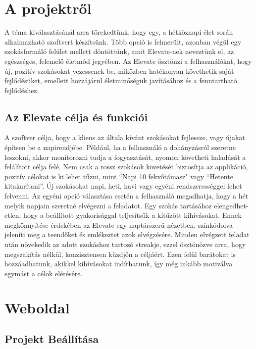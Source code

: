\documentclass[12pt]{report}
\begin{document}


\setcounter{tocdepth}{2}
\tableofcontents

\chapter{A projektről}
\begin{sloppypar}
A téma kiválasztásánál arra törekedtünk, hogy egy, a hétköznapi élet során alkalmazható szoftvert készítsünk. Több opció is felmerült, azonban végül egy szokásformáló felület mellett döntöttünk, amit Elevate-nek neveztünk el, az egészséges, felemelő életmód jegyében. Az Elevate ösztönzi a felhasználókat, hogy új, pozitív szokásokat vezessenek be, miközben hatékonyan követhetik saját fejlődésüket, emellett hozzájárul életminőségük javításához és a fenntartható fejlődéshez.
\end{sloppypar}
\section{Az Elevate célja és funkciói}
\begin{sloppypar}
A szoftver célja, hogy a kliens az általa kívánt szokásokat fejlessze, vagy újakat építsen be a napirendjébe. Például, ha a felhasználó a dohányzásról szeretne leszokni, akkor monitorozni tudja a fogyasztását, nyomon követheti haladását a felálított célja felé. Nem csak a rossz szokások követését biztosítja az applikáció, pozitív célokat is ki lehet tűzni, mint “Napi 10 fekvőtámasz" vagy “Hetente kitakarítani”. Új szokásokat napi, heti, havi vagy egyéni rendszerességgel lehet felvenni. Az egyéni opció választása esetén a felhasználó megadhatja, hogy a hét melyik napjain szeretné elvégezni a feladatot. Egy szokás tartásához elengedhet-etlen, hogy a beállított gyakorisággal teljesítsük a kitűzött kihívásokat. Ennek megkönnyítése érdekében az Elevate egy naptárszerű nézetben, színkódolva jeleníti meg a teendőket és emlékeztet azok elvégzésére. Minden elvégzett feladat után növekedik az adott szokáshoz tartozó streakje, ezzel ösztönözve arra, hogy megszakítás nélkül, konzisztensen küzdjön a céljáért. Ezen felül barátokat is hozzáadhatunk, akikkel kihívásokat indíthatunk, így még inkább motiválva egymást a célok elérésére.
\end{sloppypar}
\chapter{Weboldal}
\section{Projekt Beállítása}
\end{document}
